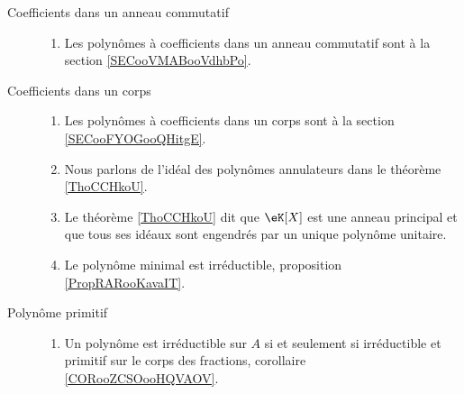 
\begin{description}
    \item[Coefficients dans un anneau commutatif]

        \begin{enumerate}
            \item
Les polynômes à coefficients dans un anneau commutatif  sont à la section \ref{SECooVMABooVdhbPo}.
        \end{enumerate}
        

    \item[Coefficients dans un corps]
        \begin{enumerate}
            \item
                
Les polynômes à coefficients dans un corps sont à la section \ref{SECooFYOGooQHitgE}.
\item
Nous parlons de l'idéal des polynômes annulateurs dans le théorème \ref{ThoCCHkoU}.
            \item
                Le théorème \ref{ThoCCHkoU} dit que \( \eK[X]\) est une anneau principal et que tous ses idéaux sont engendrés par un unique polynôme unitaire.
            \item
                Le polynôme minimal est irréductible, proposition \ref{PropRARooKavaIT}.
        \end{enumerate}
    \item[Polynôme primitif]
    
        \begin{enumerate}
            \item
                Un polynôme est irréductible sur \( A\) si et seulement si irréductible et primitif sur le corps des fractions, corollaire \ref{CORooZCSOooHQVAOV}.
        \end{enumerate}

\end{description}



